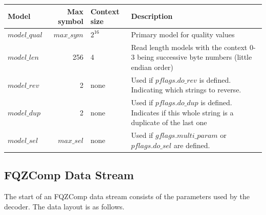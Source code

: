 \documentclass[a4paper]{article}
\begin{document}
\begin{table}[h]
\centering
\begin{tabular}{lrlp{9cm}}
 Model & Max symbol & Context size & Description\\
\hline
$model\_qual$ & $max\_sym$ & $2^{16}$ & Primary model for quality values \\
$model\_len$  & 256        & 4       & Read length models with the context 0-3 being successive byte numbers (little endian order) \\
$model\_rev$  & 2          & none    & Used if $pflags.do\_rev$ is defined.  Indicating which strings to reverse. \\
$model\_dup$  & 2          & none    & Used if $pflags.do\_dup$ is defined.  Indicates if this whole string is a duplicate of the last one \\
$model\_sel$  & $max\_sel$ & none    & Used if $gflags.multi\_param$ or $pflags.do\_sel$ are defined. \\
\end{tabular}
\end{table}

\pagebreak
\subsection{FQZComp Data Stream}

The start of an FQZComp data stream consists of the parameters used by
the decoder. The data layout is as follows.
\end{document}
